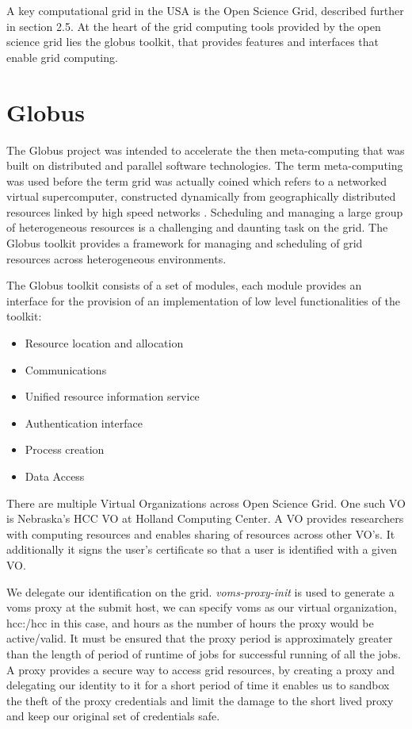 \documentclass[ms,electronic,double]{nuthesis}
\begin{document}
A key computational grid in the USA is the Open Science Grid, described further 
in section 2.5.
At the heart of the grid computing tools provided by the open science grid lies the globus toolkit, that provides
features and interfaces that enable grid computing. 
\section{Globus}
The Globus project\cite{globus} was intended to accelerate the then meta-computing that was built on 
distributed and parallel software technologies. The term meta-computing was used 
before the term grid was actually coined which refers to 
a networked virtual supercomputer, constructed dynamically from geographically 
distributed resources linked by high speed networks \cite{globus}. Scheduling 
and managing a large group of heterogeneous resources is a challenging and 
daunting task on the grid. The Globus toolkit provides a framework for managing 
and scheduling of grid resources across heterogeneous environments.

The Globus toolkit consists of a set of modules,  each module provides an 
interface for the provision of an implementation of low level functionalities of the toolkit:

\begin{itemize}
  \item{Resource location and allocation} 
  \item{Communications}
  \item{Unified resource information service}
  \item{Authentication interface}
  \item{Process creation}
  \item{Data Access}
\end{itemize}

There are multiple Virtual Organizations across Open Science Grid. One such VO 
is Nebraska's HCC VO at Holland Computing Center. A VO provides researchers with 
computing resources and enables sharing of resources across other VO's. It additionally it signs the user's certificate so that a user is identified with a given VO.

We delegate our identification on the grid. \emph{voms-proxy-init}
is used to generate a voms proxy at the submit host, we can specify voms as our 
virtual organization, hcc:/hcc in this case, and hours as the number of hours the proxy would be 
active/valid. It must be ensured that the proxy period is approximately greater than the 
length of period of runtime of jobs for successful running of all the jobs. A 
proxy provides a secure way to access grid resources, by creating a proxy and 
delegating our identity to it for a short period of time it enables us to sandbox 
the theft of the proxy credentials and limit the damage to the short lived proxy 
and keep our original set of credentials safe.
\end{document}
